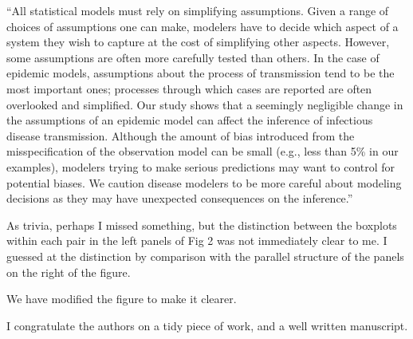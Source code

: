 \documentclass[12pt]{article}
\newcommand{\revtext}{\textsf}
\begin{document}
``All statistical models must rely on simplifying assumptions.
Given a range of choices of assumptions one can make, modelers have to
decide which aspect of a system they wish to capture 
at the cost of simplifying other aspects.
However, some assumptions are often more carefully tested than others.
In the case of epidemic models, assumptions about the process of transmission tend to be
the most important ones; processes through which cases are reported are often 
overlooked and simplified.
Our study shows that a seemingly negligible change in the assumptions of an epidemic
model can affect the inference of 
infectious disease transmission.
Although the amount of bias introduced from the misspecification of the observation
model can be small (e.g., less than 5\% in our examples), modelers
trying to make serious predictions may want to control for potential biases.
We caution disease modelers to be more careful about modeling decisions as they may have unexpected consequences on the inference.''

\revtext{As trivia, perhaps I missed something, but the distinction between the boxplots within each pair in the left panels of Fig 2 was not immediately clear to me.  I guessed at the distinction by comparison with the parallel structure of the panels on the right of the figure.}

We have modified the figure to make it clearer.

\revtext{I congratulate the authors on a tidy piece of work, and a well written manuscript.}
\end{document}

